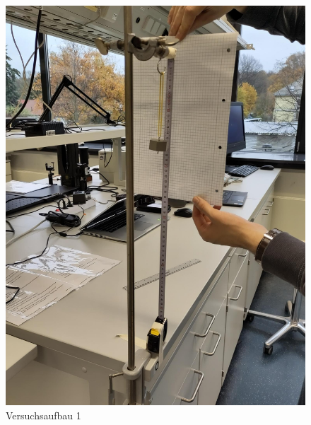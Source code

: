 \documentclass[class=article, crop=false]{standalone}
\begin{document}
\begin{figure}
\centering
\includegraphics[width=\textwidth,height=0.2\textheight]{Bilder/V1B2.jpeg}
\caption{Versuchsaufbau 1}
\end{figure}
\end{document}
